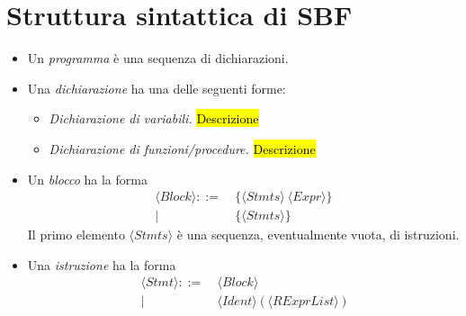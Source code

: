 \documentclass[11pt,a4paper,italian]{article}
\newcommand{\SBF}{\textbf{SBF}}
\newcommand{\token}[1]{\langle \mathit{#1} \rangle }
\begin{document}
	\section{Struttura sintattica di \SBF}
	\begin{itemize}
	\item Un \emph{programma} è una sequenza di dichiarazioni.
	
	\item Una \emph{dichiarazione} ha una delle seguenti forme:
	\begin{itemize}
		\item \emph{Dichiarazione di variabili.} \hl{Descrizione}
		\item \emph{Dichiarazione di funzioni/procedure.} \hl{Descrizione}
	\end{itemize}

	\item Un \emph{blocco} ha la forma
	\begin{align*}
	\token{Block} ::=\ &\texttt{\{} \token{Stmts}\ \token{Expr} \texttt{\}}\\
	|\ & \texttt{\{} \token{Stmts} \texttt{\}}
	\end{align*}
	Il primo elemento $\token{Stmts}$ è una sequenza, eventualmente vuota, di istruzioni.
	
	\item Una \emph{istruzione} ha la forma
	\begin{align*}
	\token{Stmt} ::= \ & \token{Block}\\
	| \ & \token{Ident}\ \texttt{(} \ \token{RExprList}\ \texttt{)}
	\end{align*}
	
	\end{itemize}
	
\end{document}
